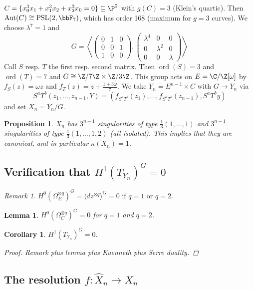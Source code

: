 \documentclass[A4paper, british]{amsart}
\theoremstyle{darkgreentheorem}
\newtheorem{lm}[thm]{Lemma}
\newtheorem{prop}[thm]{Proposition}
\newtheorem{cor}[thm]{Corollary}
\theoremstyle{darkbluedefinition}
\theoremstyle{darkredexample}
\theoremstyle{remark}
\newtheorem{rem}[thm]{Remark}
\DeclareMathOperator{\ord}{ord}
\DeclareMathOperator{\Aut}{Aut}
\newcommand{\1}{\mathbbm{1}}
\newcommand{\ot}{\otimes}
\newcommand{\tms}{\times}
\newcommand{\sub}{\subseteq}
\begin{document}
$C=\{x_{0}^{3}x_{1}+x_{1}^{3}x_{2}+x_{2}^{3}x_{0}=0\}\sub \P^{2}$ with $g(C)=3$ (Klein's quartic).
Then $\Aut(C)\cong \operatorname{PSL}(2,\bbF_{7})$, which has order 168 (maximum for $g=3$ curves).
We choose $\lambda^{7}=1$ and
\[ G=\left\langle \begin{pmatrix} 0 & 1 & 0 \\ 0 & 0 & 1 \\ 1 & 0 & 0 \end{pmatrix},
    \begin{pmatrix} \lambda^{4} & 0 & 0 \\ 0 & \lambda^{2} & 0 \\ 0 & 0 & \lambda \end{pmatrix}\right\rangle \]
Call $S$ resp. $T$ the first resp. second matrix.
Then $\ord(S)=3$ and $\ord(T)=7$ and $G\cong \Z/7\Z\tms \Z/3\Z$.
This group acts on $E=\C/\Z[\omega]$ by $f_{S}(z)=\omega z$ and $f_{T}(z)=z+\frac{1+3\omega}{7}$.
We take $Y_{n}=E^{n-1}\tms C$ with $G\to Y_{n}$ via
\[ S^{a}T^{b}(z_{1},\ldots,z_{n-1},Y)=(f_{S^{a}T^{b}}(z_{1}),\ldots, f_{S^{a}T^{b}}(z_{n-1}),S^{a}T^{b}y) \]
and set $X_{n}=Y_{n}/G$.

\begin{prop}
    $X_{n}$ has $3^{n-1}$ singularities of type $\frac{1}{3}(1,\ldots,1)$ and $3^{n-1}$ singularities of type $\frac{1}{3}(1,\ldots,1,2)$ (all isolated).
    This implies that they are canonical, and in particular $\kappa(X_{n})=1$.
\end{prop}

\subsection{Verification that $H^{1}(T_{Y_{n}})^{G}=0$}

\begin{rem}
    $H^{0}(\Omega_{E}^{\ot q})^{G}=\langle dz^{\ot q} \rangle^{G}=0$ if $q=1$ or $q=2$.
\end{rem}

\begin{lm}
    $H^{0}(\Omega_{C}^{\ot q})^{G}=0$ for $q=1$ and $q=2$.
\end{lm}

\begin{cor}
    $H^{1}(T_{Y_{n}})^{G}=0$.
    \begin{proof}
	Remark plus lemma plus Kuenneth plus Serre duality.
    \end{proof}
\end{cor}

\subsection{The resolution $f\colon \hat{X}_{n}\to X_{n}$}
\end{document}
